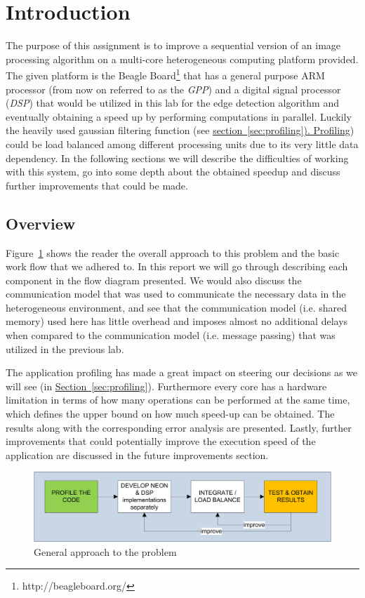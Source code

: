 \section{Introduction}

The purpose of this assignment is to improve a sequential version of an image processing algorithm on a multi-core heterogeneous computing platform provided. The given platform is the Beagle Board\footnote{http://beagleboard.org/} that has a general purpose ARM processor (from now on referred to as the \emph{GPP}) and a digital signal processor (\emph{DSP}) that would be utilized in this lab for the edge detection algorithm and eventually obtaining a speed up by performing computations in parallel. Luckily the heavily used gaussian filtering function (see \hyperref[sec:profiling]{section~\ref{sec:profiling}). Profiling}) could be load balanced among different processing units due to its very little data dependency. In the following sections we will describe the difficulties of working with this system, go into some depth about the obtained speedup and discuss further improvements that could be made.

\subsection{Overview}
Figure~\ref{fig:workflow} shows the reader the overall approach to this problem and the basic work flow that we adhered to. In this report we will go through describing each component in the flow diagram presented. We would also discuss the communication model that was used to communicate the necessary data in the heterogeneous environment, and see that the communication model (i.e. shared memory) used here has little overhead and imposes almost no additional delays when compared to the communication model (i.e. message passing) that was utilized in the previous lab.

The application profiling has made a great impact on steering our decisions as we will see (in \hyperref[sec:profiling]{Section~\ref{sec:profiling}}). Furthermore every core has a hardware limitation in terms of how many operations can be performed at the same time, which defines the upper bound on how much speed-up can be obtained. The results along with the corresponding error analysis are presented. Lastly, further improvements that could potentially improve the execution speed of the application are discussed in the future improvements section.

\begin{figure}
\includegraphics[width=\linewidth]{drawings/workflow}
\caption{General approach to the problem}
\label{fig:workflow}
\end{figure}


